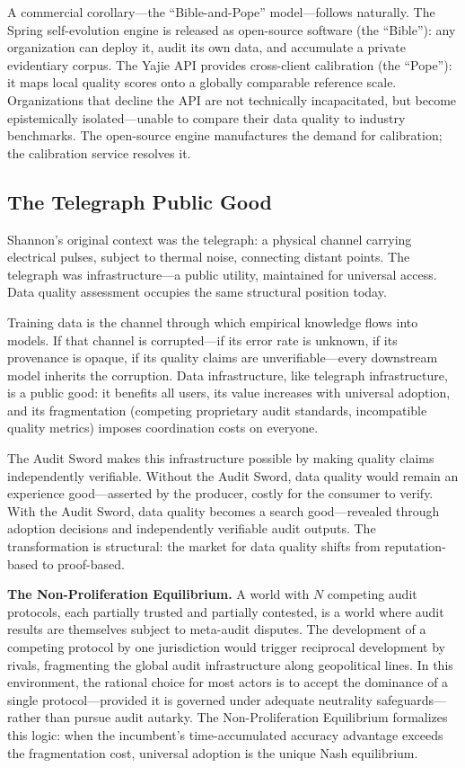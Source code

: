 \documentclass[twocolumn]{article}
\theoremstyle{definition}
\begin{document}
A commercial corollary---the ``Bible-and-Pope'' model---follows naturally. The Spring self-evolution engine is released as open-source software (the ``Bible''): any organization can deploy it, audit its own data, and accumulate a private evidentiary corpus. The Yajie API provides cross-client calibration (the ``Pope''): it maps local quality scores onto a globally comparable reference scale. Organizations that decline the API are not technically incapacitated, but become epistemically isolated---unable to compare their data quality to industry benchmarks. The open-source engine manufactures the demand for calibration; the calibration service resolves it.

\subsection{The Telegraph Public Good}

Shannon's original context was the telegraph: a physical channel carrying electrical pulses, subject to thermal noise, connecting distant points. The telegraph was infrastructure---a public utility, maintained for universal access. Data quality assessment occupies the same structural position today.

Training data is the channel through which empirical knowledge flows into models. If that channel is corrupted---if its error rate is unknown, if its provenance is opaque, if its quality claims are unverifiable---every downstream model inherits the corruption. Data infrastructure, like telegraph infrastructure, is a public good: it benefits all users, its value increases with universal adoption, and its fragmentation (competing proprietary audit standards, incompatible quality metrics) imposes coordination costs on everyone.

The Audit Sword makes this infrastructure possible by making quality claims independently verifiable. Without the Audit Sword, data quality would remain an experience good---asserted by the producer, costly for the consumer to verify. With the Audit Sword, data quality becomes a search good---revealed through adoption decisions and independently verifiable audit outputs. The transformation is structural: the market for data quality shifts from reputation-based to proof-based.

\textbf{The Non-Proliferation Equilibrium.} A world with $N$ competing audit protocols, each partially trusted and partially contested, is a world where audit results are themselves subject to meta-audit disputes. The development of a competing protocol by one jurisdiction would trigger reciprocal development by rivals, fragmenting the global audit infrastructure along geopolitical lines. In this environment, the rational choice for most actors is to accept the dominance of a single protocol---provided it is governed under adequate neutrality safeguards---rather than pursue audit autarky. The Non-Proliferation Equilibrium formalizes this logic: when the incumbent's time-accumulated accuracy advantage exceeds the fragmentation cost, universal adoption is the unique Nash equilibrium.
\end{document}
